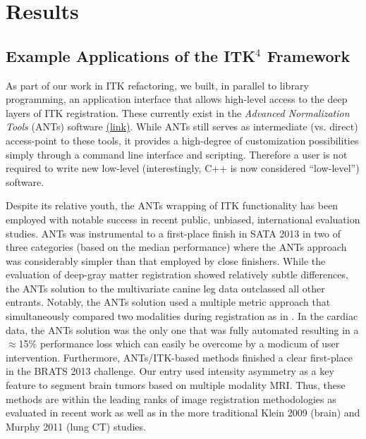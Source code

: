 \documentclass{frontiersSCNS}
\begin{document}
\section{Results}
\subsection{Example Applications of the ITK$^4$ Framework}
\label{sec:applications}
As part of our work in ITK refactoring, we built, in parallel to
library programming, an
application interface that allows high-level access to the deep layers
of ITK registration.  These currently exist in the \textit{Advanced
  Normalization Tools} (ANTs) software
\href{http://stnava.github.io/ANTs}{(link)}.  While ANTs still serves
as intermediate (vs. direct) access-point to these tools, it provides
a high-degree of customization possibilities simply through a command
line interface and scripting.  Therefore a user is not required to
write new low-level (interestingly, C++ is now considered ``low-level'') software.  

Despite its relative youth, the ANTs wrapping of ITK functionality has
been employed with notable success in recent public, unbiased,
international evaluation studies.   ANTs was instrumental to a
first-place finish in SATA 2013 in two of three categories (based on
the median performance) where the ANTs approach was considerably
simpler than that employed by close finishers.  While the evaluation
of deep-gray matter registration showed relatively subtle differences,
the ANTs solution to the multivariate
canine leg data outclassed all other entrants.  Notably, the ANTs
solution used a multiple metric approach that simultaneously compared
two modalities during registration as in \cite{Avants2008}.  In the
cardiac data, the ANTs solution was the only one that was fully
automated resulting in a $\approx$15\% performance loss which can easily be
overcome by a modicum of user intervention.   Furthermore, ANTs/ITK-based
methods finished a clear first-place in the BRATS 2013 challenge.  Our entry
used intensity asymmetry as a key feature to segment brain tumors based
on multiple modality MRI.  Thus, these methods are within the leading
ranks of image registration methodologies as evaluated in recent work
as well as in the more traditional Klein 2009 (brain) and Murphy 2011
(lung CT) studies. 
\end{document}
